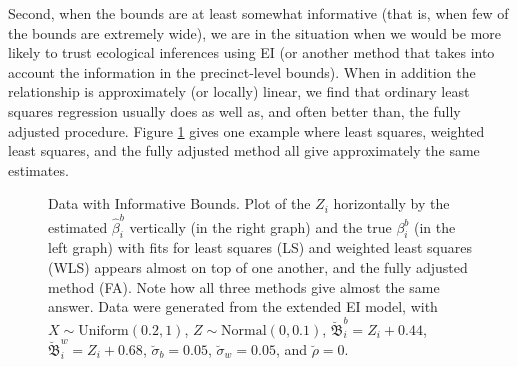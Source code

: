 \documentclass[11pt,titlepage]{article}
\newcommand{\bbeta}{{\mathfrak B}}
\newcommand{\sigmau}{\breve{\sigma}}
\newcommand{\rhou}{\breve{\rho}}
\begin{document}
Second, when the bounds are at least somewhat informative (that is,
when few of the bounds are extremely wide), we are in the situation
when we would be more likely to trust ecological inferences using EI
(or another method that takes into account the information in the
precinct-level bounds).  When in addition the relationship is
approximately (or locally) linear, we find that ordinary least squares
regression usually does as well as, and often better than, the fully
adjusted procedure.  Figure \ref{f:narrow} gives one example where
least squares, weighted least squares, and the fully adjusted method
all give approximately the same estimates.
\begin{figure}[t]
  \begin{center}
    \caption{Data with Informative Bounds. Plot of the $Z_i$ horizontally by
      the estimated $\hat\beta_i^b$ vertically (in the right graph)
      and the true $\beta_i^b$ (in the left graph) with fits for least
      squares (LS) and weighted least squares (WLS) appears almost on
      top of one another, and the fully adjusted method (FA).  Note
      how all three methods give almost the same answer. Data were
      generated from the extended EI model, with $X \sim
      \textrm{Uniform}(0.2,1)$, $Z \sim \textrm{Normal}(0,0.1)$,
      $\breve\bbeta_i^b = Z_i + 0.44$, $\breve\bbeta_i^w = Z_i +
      0.68$, $\sigmau_b = 0.05$, $\sigmau_w = 0.05$, and $\rhou = 0$.}
    \label{f:narrow}
  \end{center}
\end{figure}
\end{document}
